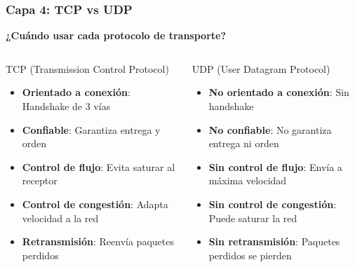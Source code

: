 \documentclass[aspectratio=169]{beamer}
\begin{document}
            \begin{frame}
            \frametitle{Capa 4: TCP vs UDP}
            
            \begin{center}
            \Large \textbf{¿Cuándo usar cada protocolo de transporte?}
            \end{center}
            
            \begin{columns}
            \begin{block}{TCP (Transmission Control Protocol)}
            \begin{itemize}
            \item \textbf{Orientado a conexión}: Handshake de 3 vías
            \item \textbf{Confiable}: Garantiza entrega y orden
            \item \textbf{Control de flujo}: Evita saturar al receptor
            \item \textbf{Control de congestión}: Adapta velocidad a la red
            \item \textbf{Retransmisión}: Reenvía paquetes perdidos
            \end{itemize}
            \end{block}
            
            \begin{block}{UDP (User Datagram Protocol)}
            \begin{itemize}
            \item \textbf{No orientado a conexión}: Sin handshake
            \item \textbf{No confiable}: No garantiza entrega ni orden
            \item \textbf{Sin control de flujo}: Envía a máxima velocidad
            \item \textbf{Sin control de congestión}: Puede saturar la red
            \item \textbf{Sin retransmisión}: Paquetes perdidos se pierden
            \end{itemize}
            \end{block}
            \end{columns}
            \end{frame}
            
\end{document}
